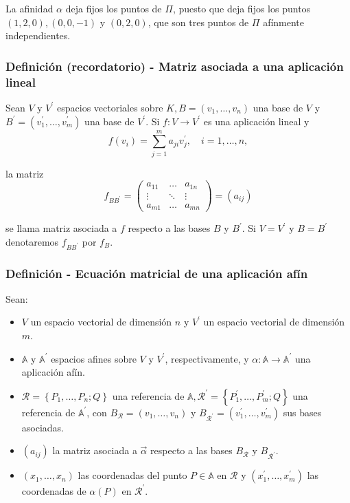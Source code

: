 \documentclass[12pt, a4paper, ones, notitlepage, openany,titlepage]{article}
\begin{document}
La afinidad $\alpha$ deja fijos los puntos de $\Pi$, puesto que deja fijos los puntos $(1,2,0),(0,0,-1)$ y $(0,2,0)$, que son tres puntos de $\Pi$ afínmente independientes.

\subsubsection{Definición (recordatorio) - Matriz asociada a una aplicación lineal} Sean $V$ y $V^{\prime}$ espacios vectoriales sobre $K, B=\left(v_{1}, \ldots, v_{n}\right)$ una base de $V$ y $B^{\prime}=\left(v_{1}^{\prime}, \ldots, v_{m}^{\prime}\right)$ una base de $V^{\prime}$. Si $f: V \rightarrow V^{\prime}$ es una aplicación lineal y
$$
f\left(v_{i}\right)=\sum_{j=1}^{m} a_{j i} v_{j}^{\prime}, \quad i=1, \ldots, n,
$$

\noindent la matriz
$$
f_{B B^{\prime}}=\left(\begin{array}{rrr}
a_{11} & \ldots & a_{1 n} \\
\vdots & \ddots & \vdots \\
a_{m 1} & \ldots & a_{m n}
\end{array}\right)=\left(a_{i j}\right)
$$

se llama matriz asociada a $f$ respecto a las bases $B$ y $B^{\prime}$. Si $V=V^{\prime}$ y $B=B^{\prime}$ denotaremos $f_{B B^{\prime}}$ por $f_{B}$.

\subsubsection{Definición - Ecuación matricial de una aplicación afín} \noindent Sean:
\begin{itemize}

\item$V$ un espacio vectorial de dimensión $n$ y $V^{\prime}$ un espacio vectorial de dimensión $m$.
\item$\mathbb{A}$ y $\mathbb{A}^{\prime}$ espacios afines sobre $V$ y $V^{\prime}$, respectivamente, y $\alpha: \mathbb{A} \rightarrow \mathbb{A}^{\prime}$ una aplicación afín.
\item$\mathcal{R}=\left\{P_{1}, \ldots, P_{n} ; Q\right\}$ una referencia de $\mathbb{A}, \mathcal{R}^{\prime}=\left\{P_{1}^{\prime}, \ldots, P_{m}^{\prime} ; Q\right\}$ una referencia de $\mathbb{A}^{\prime}$, con $B_{\mathcal{R}}=\left(v_{1}, \ldots, v_{n}\right)$ y $B_{\mathcal{R}^{\prime}}=\left(v_{1}^{\prime}, \ldots, v_{m}^{\prime}\right)$ sus bases asociadas.

\item$\left(a_{i j}\right)$ la matriz asociada a $\overrightarrow{\alpha}$ respecto a las bases $B_{\mathcal{R}}$ y $B_{\mathcal{R}^{\prime}}$. \item$\left(x_{1}, \ldots, x_{n}\right)$ las coordenadas del punto $P \in \mathbb{A}$ en $\mathcal{R}$ y $\left(x_{1}^{\prime}, \ldots, x_{m}^{\prime}\right)$ las coordenadas de $\alpha(P)$ en $\mathcal{R}^{\prime}$.

\end{itemize}
\end{document}
